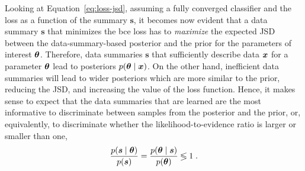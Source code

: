 Looking at Equation~\eqref{eq:loss-jsd}, assuming a fully converged classifier and the loss as a function of the summary $\boldsymbol{s}$, it becomes now evident that a data summary $\boldsymbol{s}$ that minimizes the \gls*{bce} loss has to \emph{maximize} the expected JSD between the data-summary-based posterior and the prior for the parameters of interest $\bm{\theta}$. Therefore, data summaries $\boldsymbol{s}$ that sufficiently describe data $\bm{x}$ for a parameter $\bm{\theta}$ lead to posteriors $p(\bm{\theta}\mid\bm{x})$. On the other hand, inefficient data summaries will lead to wider posteriors which are more similar to the prior, reducing the JSD, and increasing the value of the loss function.  Hence, it makes sense to expect that the data summaries that are learned are the most informative to discriminate between samples from the posterior and the prior, or, equivalently, to discriminate whether the likelihood-to-evidence ratio is larger or smaller than one,
\begin{equation}
    \frac{p(\boldsymbol{s} \mid \bm{\theta})}{p(\boldsymbol{s})}  = 
    \frac{p(\bm{\theta}\mid \boldsymbol{s})}{p(\bm{\theta})} 
    \lessgtr 1\;.
\end{equation}


%

